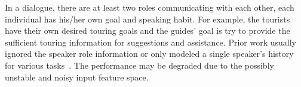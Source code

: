 \documentclass{article}
\begin{document}


In a dialogue, there are at least two roles communicating with each other, each individual has his/her own goal and speaking habit.
For example, the tourists have their own desired touring goals and the guides' goal is try to provide the sufficient touring information for suggestions and assistance.
Prior work usually ignored the speaker role information or only modeled a single speaker's history for various tasks~\cite{chen2016end,yang2017end}.
The performance may be degraded due to the possibly unstable and noisy input feature space.
\end{document}
